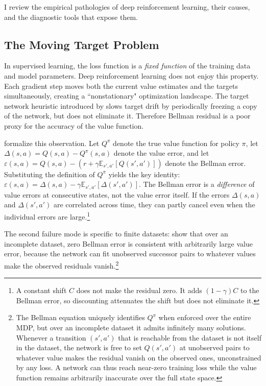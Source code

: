 
I review the empirical pathologies of deep reinforcement learning, their causes, and the diagnostic tools that expose them.

\subsection{The Moving Target Problem}
\label{sec:moving_target}

In supervised learning, the loss function is a \textit{fixed function} of the training data and model parameters. Deep reinforcement learning does not enjoy this property. Each gradient step moves both the current value estimates and the targets simultaneously, creating a ``nonstationary" optimization landscape. The target network heuristic introduced by \citet{mnih2015} slows target drift by periodically freezing a copy of the network, but does not eliminate it. Therefore Bellman residual is a poor proxy for the accuracy of the value function.

\citet{Fujimoto2022} formalize this observation. Let $Q^\pi$ denote the true value function for policy $\pi$, let $\Delta(s,a) = Q(s,a) - Q^\pi(s,a)$ denote the value error, and let $\varepsilon(s,a) = Q(s,a) - (r + \gamma \mathbb{E}_{s',a'}[Q(s',a')])$ denote the Bellman error. Substituting the definition of $Q^\pi$ yields the key identity: $\varepsilon(s,a) = \Delta(s,a) - \gamma \mathbb{E}_{s',a'}[\Delta(s',a')]$. The Bellman error is a \emph{difference} of value errors at consecutive states, not the value error itself. If the errors $\Delta(s,a)$ and $\Delta(s',a')$ are correlated across time, they can partly cancel even when the individual errors are large.\footnote{A constant shift $C$ does not make the residual zero. It adds $(1-\gamma)C$ to the Bellman error, so discounting attenuates the shift but does not eliminate it.}

The second failure mode is specific to finite datasets: \citet[Corollary~1]{Fujimoto2022} show that over an incomplete dataset, zero Bellman error is consistent with arbitrarily large value error, because the network can fit unobserved successor pairs to whatever values make the observed residuals vanish.\footnote{The Bellman equation uniquely identifies $Q^\pi$ when enforced over the entire MDP, but over an incomplete dataset it admits infinitely many solutions. Whenever a transition $(s',a')$ that is reachable from the dataset is not itself in the dataset, the network is free to set $Q(s',a')$ at unobserved pairs to whatever value makes the residual vanish on the observed ones, unconstrained by any loss. A network can thus reach near-zero training loss while the value function remains arbitrarily inaccurate over the full state space.}

